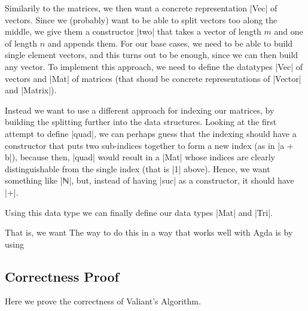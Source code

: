 Similarily to the matrices, we then want a concrete representation |Vec| of vectors. Since we (probably) want to be able to split vectors too along the middle, we give them a constructor |two| that takes a vector of length $m$ and one of length $n$ and appends them. For our base cases, we need to be able to build single element vectors, and this turns out to be enough, since we can then build any vector. 
To implement this approach, we need to define the datatypes |Vec| of vectors and |Mat| of matrices (that shoud be concrete representations of |Vector| and |Matrix|).


Instead we want to use a different approach for indexing our matrices, by building the splitting further into the data structures. Looking at the first attempt to define |quad|, we can perhaps guess that the indexing should have a constructor that puts two sub-indices together to form a new index (as in |a + b|), because then, |quad| would result in a |Mat| whose indices are clearly distinguishable from the single index (that is |1| above). Hence, we want something like |ℕ|, but, instead of having |suc| as a constructor, it should have |+|. 

Using this data type we can finally define our data types  |Mat| and |Tri|.



That is, we want 
The way to do this in a way that works well with Agda is by using 



\subsection{Correctness Proof}
Here we prove the correctness of Valiant's Algorithm.
